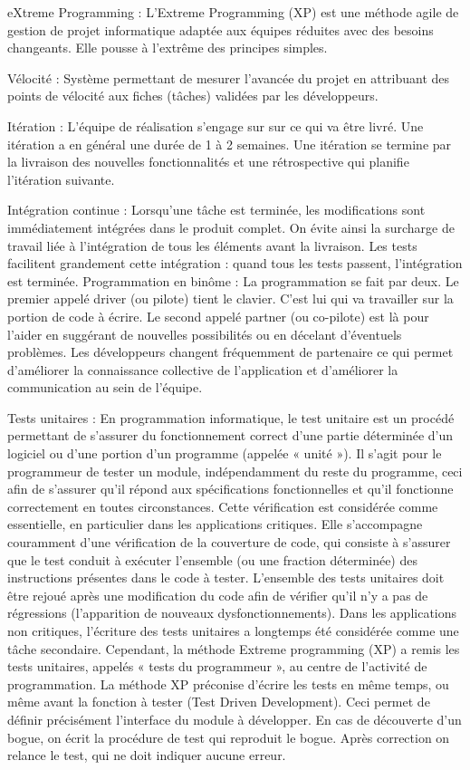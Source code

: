 \documentclass{article}
\begin{document}
eXtreme Programming : L'Extreme Programming (XP) est une méthode agile de gestion de projet informatique adaptée aux équipes réduites avec des besoins changeants. Elle pousse à l'extrême des principes simples. 

Vélocité : Système permettant de mesurer l'avancée du projet en attribuant des points de vélocité aux fiches (t\^aches) validées par les développeurs.

Itération : L'équipe de réalisation s'engage sur sur ce qui va être livré. Une itération a en général une durée de 1 à 2 semaines. Une itération se termine par la livraison des nouvelles fonctionnalités et une rétrospective qui planifie l'itération suivante.

Intégration continue : Lorsqu'une t\^ache est terminée, les modifications sont immédiatement intégrées dans le produit complet. On évite ainsi la surcharge de travail liée à l'intégration de tous les éléments avant la livraison. Les tests facilitent grandement cette intégration : quand tous les tests passent, l'intégration est terminée. 
Programmation en bin\^ome : La programmation se fait par deux. Le premier appelé driver (ou pilote) tient le clavier. C'est lui qui va travailler sur la portion de code à écrire. Le second appelé partner (ou co-pilote) est là pour l'aider en suggérant de nouvelles possibilités ou en décelant d'éventuels problèmes. Les développeurs changent fréquemment de partenaire ce qui permet d'améliorer la connaissance collective de l'application et d'améliorer la communication au sein de l'équipe. 

Tests unitaires : En programmation informatique, le test unitaire est un procédé permettant de s'assurer du fonctionnement correct d'une partie déterminée d'un logiciel ou d'une portion d'un programme (appelée « unité »).
Il s'agit pour le programmeur de tester un module, indépendamment du reste du programme, ceci afin de s'assurer qu'il répond aux spécifications fonctionnelles et qu'il fonctionne correctement en toutes circonstances. Cette vérification est considérée comme essentielle, en particulier dans les applications critiques. Elle s'accompagne couramment d'une vérification de la couverture de code, qui consiste à s'assurer que le test conduit à exécuter l'ensemble (ou une fraction déterminée) des instructions présentes dans le code à tester.
L'ensemble des tests unitaires doit être rejoué après une modification du code afin de vérifier qu'il n'y a pas de régressions (l'apparition de nouveaux dysfonctionnements).
Dans les applications non critiques, l'écriture des tests unitaires a longtemps été considérée comme une t\^ache secondaire. Cependant, la méthode Extreme programming (XP) a remis les tests unitaires, appelés « tests du programmeur », au centre de l'activité de programmation.
La méthode XP préconise d'écrire les tests en même temps, ou même avant la fonction à tester (Test Driven Development). Ceci permet de définir précisément l'interface du module à développer. En cas de découverte d'un bogue, on écrit la procédure de test qui reproduit le bogue. Après correction on relance le test, qui ne doit indiquer aucune erreur.
\end{document}

